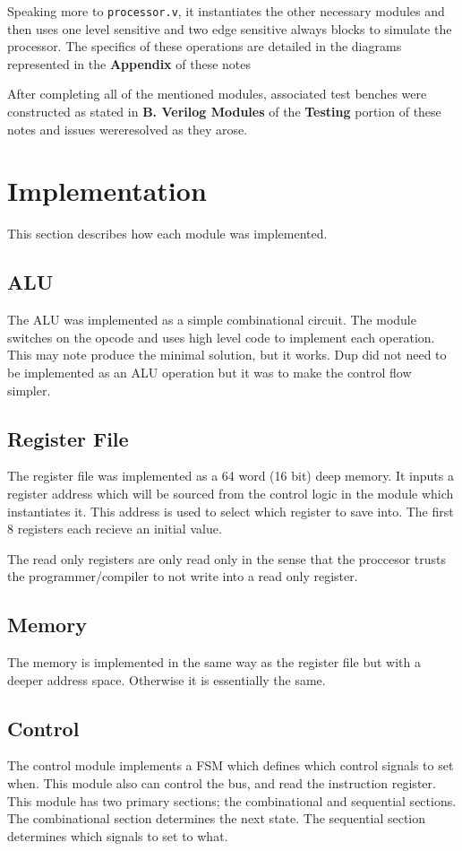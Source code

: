 \documentclass[conference]{IEEEtran}
\begin{document}
Speaking more to \texttt{processor.v}, it instantiates the other necessary modules
and then uses one level sensitive  and two edge sensitive always blocks to 
simulate the processor. The specifics of these operations are detailed 
in the diagrams represented in the \textbf{Appendix} of these notes
 
After completing all of the mentioned modules, associated test benches were 
constructed as stated in \textbf{B. Verilog Modules} of the \textbf{Testing} portion
of these notes and issues wereresolved as they arose.
 
\section{Implementation}
This section describes how each module was implemented.
\subsection{ALU}
The ALU was implemented as a simple combinational circuit. The module switches
on the opcode and uses high level code to implement each operation. This may
note produce the minimal solution, but it works. Dup did not need to be 
implemented as an ALU operation but it was to make the control flow simpler.
\subsection{Register File}
The register file was implemented as a 64 word (16 bit) deep memory. It inputs
a register address which will be sourced from the control logic in the module
which instantiates it. This address is used to select which register to save
into. The first 8 registers each recieve an initial value. 

The read only registers are only read only in the sense that the proccesor
trusts the programmer/compiler to not write into a read only register.
\subsection{Memory}
The memory is implemented in the same way as the register file but with
a deeper address space. Otherwise it is essentially the same.
\subsection{Control}
The control module implements a FSM which defines which control signals to 
set when. This module also can control the bus, and read the instruction register.
This module has two primary sections; the combinational and sequential sections.
The combinational section determines the next state. The sequential section
determines which signals to set to what.
\end{document}
